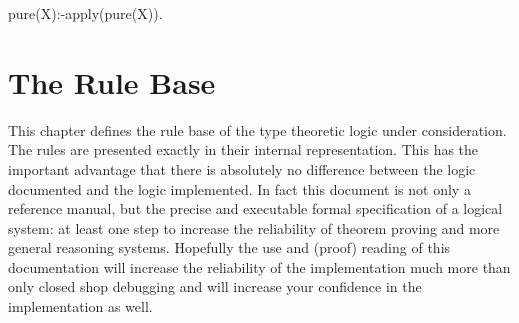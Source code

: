 \documentclass[11pt]{report}
\makeatletter
\newcommand{\ulinv}[1]{\index{#1@\texttt{#1}}}
\makeatother
\begin{document}
 \ulinv{pure}
\begin{sf}\begin{tabbing}
pure(X):-apply(pure(X)).\\[-0.7ex]

\end{tabbing}\end{sf}

 \normalsize 
  
  
 \chapter{The Rule Base}
 
 This chapter defines the rule base of the type theoretic
 logic under consideration. The rules are presented 
 exactly in their internal representation. 
 This has the important advantage that there is
 absolutely no difference between the logic documented and
 the logic implemented. In fact this document is not
 only a reference manual, but the precise and executable
 formal specification of a logical system: at least
 one step to increase the reliability of theorem proving
 and more general reasoning systems. Hopefully the 
 use and (proof) reading of this documentation
 will increase the reliability of the 
 implementation much more than only closed shop debugging
 and will increase your confidence in the implementation as well.
  
\end{document}
